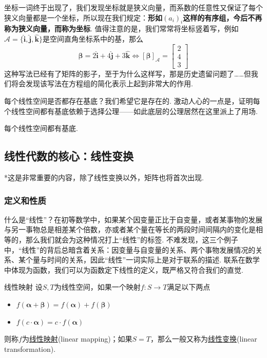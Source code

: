 \documentclass[main.tex]{subfiles}
\begin{document}
坐标一词终于出现了，我们发现坐标就是狭义向量，而系数的任意性又保证了每个狭义向量都是一个坐标，所以现在我们规定：\textbf{形如\((a_i)_i\)这样的有序组，今后不再称为狭义向量，而称为坐标}. 值得注意的是，我们常常将坐标竖着写，例如\(\mathcal A = \{\bm{\hat i}, \bm{\hat j}, \bm{\hat k}\}\)是空间直角坐标系中的基，那么
\[\bm\beta = 2\bm{\hat i} + 4\bm{\hat j} + 3\bm{\hat k} \Longleftrightarrow [\bm\beta]_\mathcal{A} = \begin{bmatrix} 2 \\ 4 \\ 3 \end{bmatrix}\]
这种写法已经有了矩阵的影子，至于为什么这样写，那是历史遗留问题了……但我们将会发现该写法在方程组的简化表示上起到非常大的作用.

每个线性空间是否都存在基底？我们希望它是存在的. 激动人心的一点是，证明每个线性空间都有基底依赖于选择公理——如此底层的公理居然在这里派上了用场.

\begin{proposition}{}
    每个线性空间都有基底.
\end{proposition}

\subsection{线性代数的核心：线性变换}

*这是非常重要的内容，除了线性变换以外，矩阵也将首次出现.

\subsubsection{定义和性质}

什么是“线性”？在初等数学中，如果某个因变量正比于自变量，或者某事物的发展与另一事物总是相差某个倍数，亦或者某个量在等长的两段时间间隔内的变化是相等的，那么我们就会为这种情况打上“线性”的标签. 不难发现，这三个例子中，“线性”的背后总暗含着关系：因变量与自变量的关系、两个事物发展情况的关系、某个量与时间的关系，因此“线性”一词实际上是对于联系的描述. 联系在数学中体现为函数，我们可以为函数定下线性的定义，既严格又符合我们的直觉.

\begin{definition}{线性映射}
    设\(S,T\)为线性空间，如果一个映射\(f:S \to T\)满足以下两点
    \begin{itemize}
        \item [(1)] \(f(\bm\alpha+\bm\beta) = f(\bm\alpha)+f(\bm\beta)\)
        \item [(2)] \( f(c\cdot\bm\alpha) = c\cdot f(\bm\alpha)\)
    \end{itemize}
    则称\(f\)为\uline{线性映射}(linear mapping)；如果\(S=T\)，那么一般又称为\uline{线性变换}(linear transformation).
\end{definition}
\end{document}
